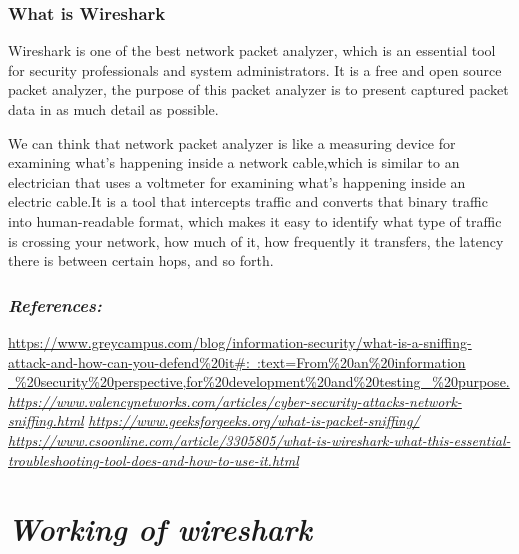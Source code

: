 \documentclass[a4paper,12pt]{report}
\begin{document}
\subsection{What is Wireshark}

Wireshark is one of the best network packet analyzer, which is an
essential tool for security professionals and system administrators. It
is a free and open source packet analyzer, the purpose of this packet
analyzer is to present captured packet data in as much detail as
possible.

We can think that network packet analyzer is like a measuring device for
examining what's happening inside a network cable,which is similar to an
electrician that uses a voltmeter for examining what's happening inside
an electric cable.It is a tool that intercepts traffic and converts that
binary traffic into human-readable format, which makes it easy to
identify what type of traffic is crossing your network, how much of it,
how frequently it transfers, the latency there is between certain hops,
and so forth.

\subsection{\Large \emph{References: }}
\begin{flushleft}
\href{https://www.greycampus.com/blog/information-security/what-is-a-sniffing-attack-and-how-can-you-defend\%20it\#:~:text=From\%20an\%20information\%20security\%20perspective,for\%20development\%20and\%20testing\%20purpose.}{https://www.greycampus.com/blog/information-security/what-is-a-sniffing-attack-and-how-can-you-defend\%20it\#:~:text=From\%20an\%20information \ \%20security\%20perspective,for\%20development\%20and\%20testing \ \%20purpose.}
\bigbreak
\href{https://www.valencynetworks.com/articles/cyber-security-attacks-network-sniffing.html}{\emph{https://www.valencynetworks.com/articles/cyber-security-attacks-network-sniffing.html}}
\bigbreak
\href{https://www.geeksforgeeks.org/what-is-packet-sniffing/}{\emph{https://www.geeksforgeeks.org/what-is-packet-sniffing/}}
\bigbreak
\href{https://www.csoonline.com/article/3305805/what-is-wireshark-what-this-essential-troubleshooting-tool-does-and-how-to-use-it.html}{\emph{https://www.csoonline.com/article/3305805/what-is-wireshark-what-this-essential-troubleshooting-tool-does-and-how-to-use-it.html}}
\end{flushleft}
\chapter{\emph{Working of wireshark}}
\end{document}
